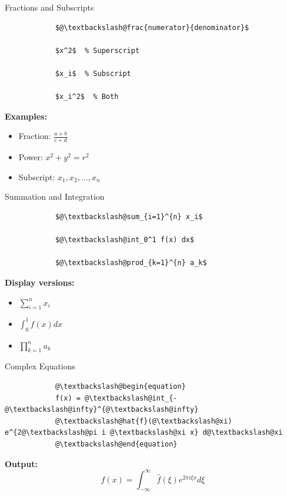 \documentclass[aspectratio=169]{beamer}
\begin{document}
	\begin{frame}[fragile]{Fractions and Subscripts}
		\begin{lstlisting}
			$@\textbackslash@frac{numerator}{denominator}$
			
			$x^2$  % Superscript
			
			$x_i$  % Subscript
			
			$x_i^2$  % Both
		\end{lstlisting}
		
		\vspace{1em}
		
		\textbf{Examples:}
		\begin{itemize}
			\item Fraction: $\frac{a+b}{c+d}$
			\item Power: $x^2 + y^2 = r^2$
			\item Subscript: $x_1, x_2, \ldots, x_n$
		\end{itemize}
	\end{frame}
	
	\begin{frame}[fragile]{Summation and Integration}
		\begin{lstlisting}
			$@\textbackslash@sum_{i=1}^{n} x_i$
			
			$@\textbackslash@int_0^1 f(x) dx$
			
			$@\textbackslash@prod_{k=1}^{n} a_k$
		\end{lstlisting}
		
		\vspace{1em}
		
		\textbf{Display versions:}
		\begin{itemize}
			\item $\displaystyle\sum_{i=1}^{n} x_i$
			\item $\displaystyle\int_0^1 f(x) dx$
			\item $\displaystyle\prod_{k=1}^{n} a_k$
		\end{itemize}
	\end{frame}
	
	\begin{frame}[fragile]{Complex Equations}
		\begin{lstlisting}
			@\textbackslash@begin{equation}
			f(x) = @\textbackslash@int_{-@\textbackslash@infty}^{@\textbackslash@infty}
			@\textbackslash@hat{f}(@\textbackslash@xi) e^{2@\textbackslash@pi i @\textbackslash@xi x} d@\textbackslash@xi
			@\textbackslash@end{equation}
		\end{lstlisting}
		
		\vspace{0.5em}
		
		\textbf{Output:}
		\begin{equation}
			f(x) = \int_{-\infty}^{\infty} \hat{f}(\xi) e^{2\pi i \xi x} d\xi
		\end{equation}
	\end{frame}
	
\end{document}
